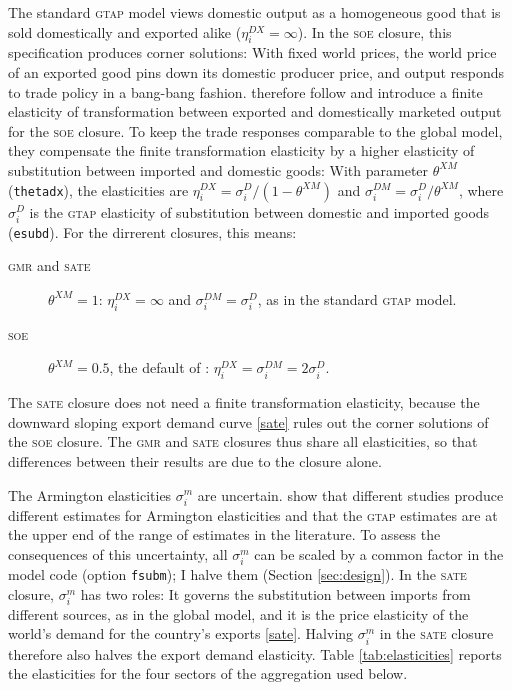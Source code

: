 \documentclass{jgea}
\newcommand{\SOE}{\textsc{soe}\xspace}
\newcommand{\SATE}{\textsc{sate}\xspace}
\newcommand{\GMR}{\textsc{gmr}\xspace}
\newcommand{\GTAP}{\textsc{gtap}\xspace}
\begin{document}
The standard \GTAP model views domestic output as a homogeneous good that is sold domestically and exported alike ($\eta^{DX}_i=\infty$).
In the \SOE closure, this specification produces corner solutions:
With fixed world prices, the world price of an exported good pins down its domestic producer price, and output responds to trade policy in a bang-bang fashion.
\citet{LanzRutherford2016} therefore follow \citet{DeMeloRobinson1989} and introduce a finite elasticity of transformation between exported and domestically marketed output for the \SOE closure.
To keep the trade responses comparable to the global model, they compensate the finite transformation elasticity by a higher elasticity of substitution between imported and domestic goods:
With parameter $\theta^{XM}$ (\texttt{thetadx}), the elasticities are $\eta^{DX}_i=\sigma^D_i/(1-\theta^{XM})$ and $\sigma^{DM}_i=\sigma^D_i/\theta^{XM}$, where $\sigma^D_i$ is the \GTAP elasticity of substitution between domestic and imported goods (\texttt{esubd}).
For the dirrerent closures, this means:
\begin{description}
\item[\GMR and \SATE] $\theta^{XM}=1$: $\eta^{DX}_i=\infty$ and $\sigma^{DM}_i=\sigma^D_i$, as in the standard \GTAP model.
\item[\SOE] $\theta^{XM}=0.5$, the default of \citet{LanzRutherford2016}: $\eta^{DX}_i=\sigma^{DM}_i=2\sigma^D_i$.
\end{description}
The \SATE closure does not need a finite transformation elasticity, because the downward sloping export demand curve \eqref{sate} rules out the corner solutions of the \SOE closure.
The \GMR and \SATE closures thus share all elasticities, so that differences between their results are due to the closure alone.

The Armington elasticities $\sigma^m_i$ are uncertain.
\citet{Ahmad2021} show that different studies produce different estimates for Armington elasticities and that the \GTAP estimates are at the upper end of the range of estimates in the literature.
To assess the consequences of this uncertainty, all $\sigma^m_i$ can be scaled by a common factor in the model code (option \texttt{fsubm}); I halve them (Section \ref{sec:design}).
In the \SATE closure, $\sigma^m_i$ has two roles:
It governs the substitution between imports from different sources, as in the global model, and it is the price elasticity of the world's demand for the country's exports \eqref{sate}.
Halving $\sigma^m_i$ in the \SATE closure therefore also halves the export demand elasticity.
Table \ref{tab:elasticities} reports the elasticities for the four sectors of the aggregation used below.
\end{document}
